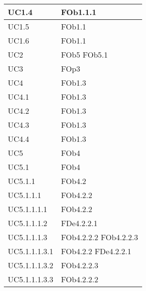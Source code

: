 \begin{longtable}{|l|p{4cm}|}
\hline
		UC1.4 & FOb1.1.1 \linebreak   \\
\hline
		UC1.5 & FOb1.1 \linebreak   \\
\hline
		UC1.6 & FOb1.1 \linebreak   \\
\hline
		UC2 & FOb5 \linebreak  FOb5.1 \linebreak   \\
\hline
		UC3 & FOp3 \linebreak   \\
\hline
		UC4 & FOb1.3 \linebreak   \\
\hline
		UC4.1 & FOb1.3 \linebreak   \\
\hline
		UC4.2 & FOb1.3 \linebreak   \\
\hline
		UC4.3 & FOb1.3 \linebreak   \\
\hline
		UC4.4 & FOb1.3 \linebreak   \\
\hline
		UC5 & FOb4 \linebreak   \\
\hline
		UC5.1 & FOb4 \linebreak   \\
\hline
		UC5.1.1 & FOb4.2 \linebreak   \\
\hline
		UC5.1.1.1 & FOb4.2.2 \linebreak   \\
\hline
		UC5.1.1.1.1 & FOb4.2.2 \linebreak   \\
\hline
		UC5.1.1.1.2 & FDe4.2.2.1 \linebreak   \\
\hline
		UC5.1.1.1.3 & FOb4.2.2.2 \linebreak  FOb4.2.2.3 \linebreak   \\
\hline
		UC5.1.1.1.3.1 & FOb4.2.2 \linebreak  FDe4.2.2.1 \linebreak   \\
\hline
		UC5.1.1.1.3.2 & FOb4.2.2.3 \linebreak   \\
\hline
		UC5.1.1.1.3.3 & FOb4.2.2.2 \linebreak   \\

\end{longtable}
